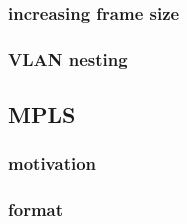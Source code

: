 \subsubsection{increasing frame size}

\subsubsection{VLAN nesting}

\subsection{MPLS}

\subsubsection{motivation}

\subsubsection{format}
